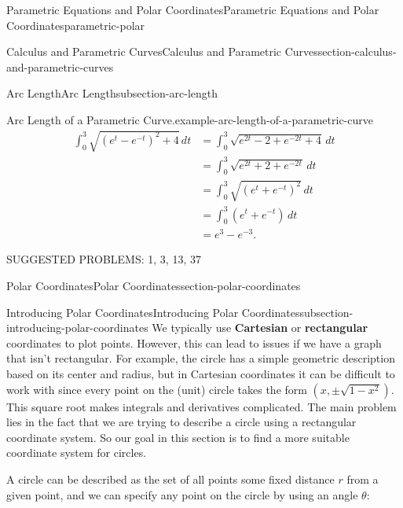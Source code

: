 \documentclass[oneside,10pt,]{book}
\newcommand{\terminology}[1]{\textbf{#1}}
\numberwithin{equation}{section}
\newcommand{\amp}{&}
\begin{document}
\begin{chapterptx}{Parametric Equations and Polar Coordinates}{}{Parametric Equations and Polar Coordinates}{}{}{parametric-polar}
\begin{sectionptx}{Calculus and Parametric Curves}{}{Calculus and Parametric Curves}{}{}{section-calculus-and-parametric-curves}
\begin{subsectionptx}{Arc Length}{}{Arc Length}{}{}{subsection-arc-length}
\begin{example}{Arc Length of a Parametric Curve.}{example-arc-length-of-a-parametric-curve}
%
\begin{align*}
\int_{0}^{3}\sqrt{(e^{t}-e^{-t})^{2} + 4}\,dt \amp = \int_{0}^{3}\sqrt{e^{2t}-2 + e^{-2t} + 4}\,dt \\
\amp = \int_{0}^{3}\sqrt{e^{2t} + 2 + e^{-2t}}\,dt \\
\amp = \int_{0}^{3}\sqrt{(e^{t}+e^{-t})^{2}}\,dt \\
\amp = \int_{0}^{3}(e^{t}+e^{-t})\,dt\\
\amp = e^{3}-e^{-3}.
\end{align*}
\end{example}
\hypertarget{p-1013}{}%
SUGGESTED PROBLEMS: 1, 3, 13, 37%
\end{subsectionptx}
\end{sectionptx}
%
%
\typeout{************************************************}
\typeout{************************************************}
%
\begin{sectionptx}{Polar Coordinates}{}{Polar Coordinates}{}{}{section-polar-coordinates}
%
%
\typeout{************************************************}
\typeout{************************************************}
%
\begin{subsectionptx}{Introducing Polar Coordinates}{}{Introducing Polar Coordinates}{}{}{subsection-introducing-polar-coordinates}
\hypertarget{p-1014}{}%
We typically use \terminology{Cartesian} or \terminology{rectangular} coordinates to plot points. However, this can lead to issues if we have a graph that isn't rectangular. For example, the circle has a simple geometric description based on its center and radius, but in Cartesian coordinates it can be difficult to work with since every point on the (unit) circle takes the form \((x,\pm\sqrt{1-x^{2}})\). This square root makes integrals and derivatives complicated. The main problem lies in the fact that we are trying to describe a circle using a rectangular coordinate system. So our goal in this section is to find a more suitable coordinate system for circles.%
\par
\hypertarget{p-1015}{}%
A circle can be described as the set of all points some fixed distance \(r\) from a given point, and we can specify any point on the circle by using an angle \(\theta\):%
\begin{figure}
\centering
{
}
\end{figure}
\end{subsectionptx}
\end{sectionptx}
\end{chapterptx}
\end{document}
